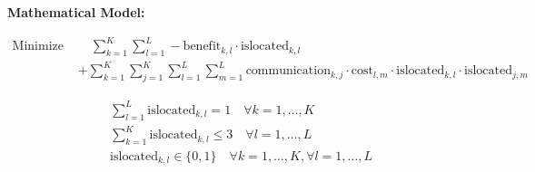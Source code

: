 \documentclass{article}
\begin{document}
\textbf{Mathematical Model:}

\begin{align*}
\text{Minimize } & \quad \sum_{k=1}^{K} \sum_{l=1}^{L} -\text{benefit}_{k, l} \cdot \text{islocated}_{k, l} \\
& + \sum_{k=1}^{K} \sum_{j=1}^{K} \sum_{l=1}^{L} \sum_{m=1}^{L} \text{communication}_{k, j} \cdot \text{cost}_{l, m} \cdot \text{islocated}_{k, l} \cdot \text{islocated}_{j, m}
\end{align*}


\begin{align*}
& \sum_{l=1}^{L} \text{islocated}_{k, l} = 1 \quad \forall k = 1, \ldots, K \\
& \sum_{k=1}^{K} \text{islocated}_{k, l} \leq 3 \quad \forall l = 1, \ldots, L \\
& \text{islocated}_{k, l} \in \{0, 1\} \quad \forall k = 1, \ldots, K, \forall l = 1, \ldots, L
\end{align*}
\end{document}
